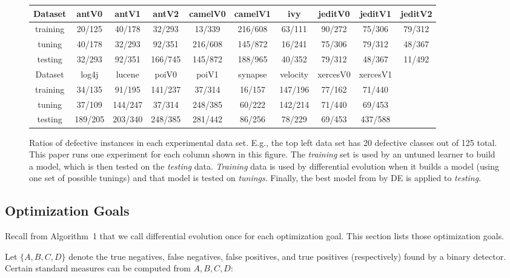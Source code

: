 \documentclass{sig-alternative}
\def\baselinestretch{1}
\begin{document}
 \begin{figure}[!t]

\renewcommand{\baselinestretch}{0.8}
\scriptsize
\centering
  \begin{tabular}{c c c c c c c c c c }\hline
  Dataset &antV0&antV1&antV2&camelV0&camelV1&ivy&jeditV0&jeditV1&jeditV2
\\\hline
  training &20/125 &40/178 &32/293 &13/339 &216/608 &63/111 &90/272 &75/306 &79/312
\\  tuning  &40/178 &32/293 &92/351 &216/608 &145/872 &16/241 &75/306 &79/312 &48/367
\\  testing &32/293 &92/351 &166/745 &145/872 &188/965 &40/352 &79/312 &48/367 &11/492
\\ \hline
  Dataset &log4j&lucene&poiV0&poiV1&synapse&velocity&xercesV0&xercesV1
\\\hline
  training &34/135 &91/195 &141/237 &37/314 &16/157 &147/196 &77/162 &71/440
\\  tuning  &37/109 &144/247 &37/314 &248/385 &60/222 &142/214 &71/440 &69/453
\\  testing &189/205 &203/340 &248/385 &281/442 &86/256 &78/229 &69/453 &437/588
\\  \end{tabular}

   \caption{Ratios of defective instances in each experimental data set. 
   E.g., the top left data set has 20 defective classes out of 125 total.
   This paper runs one experiment for each column
   shown in this figure. The {\em training} set is used by an untuned learner
   to build a model, which is then tested on the {\em testing} data.
   {\em Training} data is used by  differential evolution when it builds
    a model (using one set of possible tunings) and that model is tested on {\em tunings}.
    Finally, the best model from by DE is applied to {\em testing}.  
   }\label{fig:data1}
\end{figure} 

\subsection{Optimization Goals}

Recall from Algorithm~1 that we call differential evolution once for each
 optimization goal. This section lists those optimization goals.

Let $\{A,B,C,D\}$ denote the
true negatives, 
false negatives, 
false positives, and 
true positives
(respectively) found by a binary detector. 
Certain standard measures can be computed from
$A,B,C,D$: 
\end{document}
